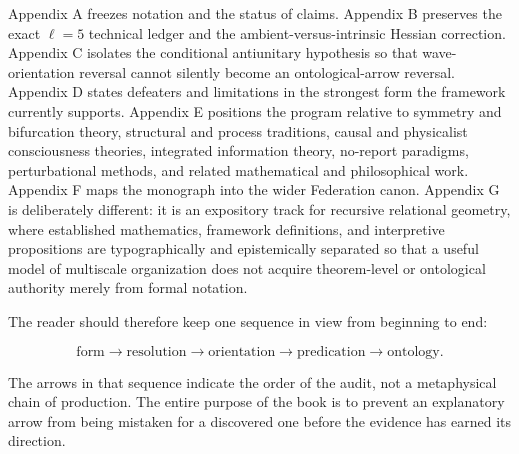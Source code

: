 Appendix A freezes notation and the status of claims. Appendix B preserves the exact $\ell=5$ technical ledger and the ambient-versus-intrinsic Hessian correction. Appendix C isolates the conditional antiunitary hypothesis so that wave-orientation reversal cannot silently become an ontological-arrow reversal. Appendix D states defeaters and limitations in the strongest form the framework currently supports. Appendix E positions the program relative to symmetry and bifurcation theory, structural and process traditions, causal and physicalist consciousness theories, integrated information theory, no-report paradigms, perturbational methods, and related mathematical and philosophical work. Appendix F maps the monograph into the wider Federation canon. Appendix G is deliberately different: it is an expository track for recursive relational geometry, where established mathematics, framework definitions, and interpretive propositions are typographically and epistemically separated so that a useful model of multiscale organization does not acquire theorem-level or ontological authority merely from formal notation.

The reader should therefore keep one sequence in view from beginning to end:

\[
\text{form}
\longrightarrow
\text{resolution}
\longrightarrow
\text{orientation}
\longrightarrow
\text{predication}
\longrightarrow
\text{ontology}.
\]

The arrows in that sequence indicate the order of the audit, not a metaphysical chain of production. The entire purpose of the book is to prevent an explanatory arrow from being mistaken for a discovered one before the evidence has earned its direction.
